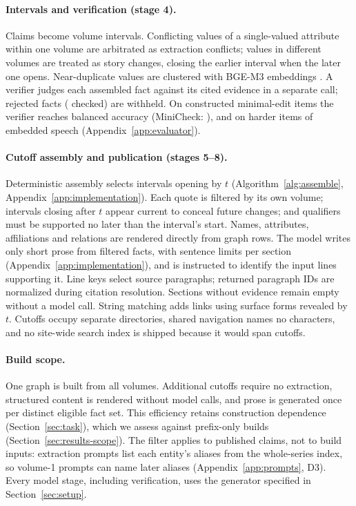 \paragraph{Intervals and verification (stage 4).}
Claims become volume intervals. Conflicting values of a single-valued attribute within one
volume are arbitrated as extraction conflicts; values in different volumes are treated as
story changes, closing the earlier interval when the later one opens. Near-duplicate values
are clustered with BGE-M3 embeddings \citep{chen2024m3}. A verifier judges each assembled
fact against its cited evidence in a separate call; rejected facts (
checked) are withheld.
On  constructed minimal-edit items the verifier reaches 
balanced accuracy (MiniCheck: ), and  on
 harder items of embedded speech (Appendix~\ref{app:evaluator}).

\paragraph{Cutoff assembly and publication (stages 5--8).}
Deterministic assembly selects intervals opening by $t$
(Algorithm~\ref{alg:assemble}, Appendix~\ref{app:implementation}). Each quote is filtered
by its own volume; intervals closing after $t$ appear current to conceal future changes;
and qualifiers must be supported no later than the interval's start. Names, attributes,
affiliations and relations are rendered directly from graph rows. The model writes only
short prose from filtered facts, with sentence limits per section
(Appendix~\ref{app:implementation}), and is instructed to identify the input lines supporting it.
Line keys select source paragraphs; returned paragraph IDs are normalized during citation
resolution. Sections without evidence remain empty without a model call.
String matching adds links using surface forms revealed by $t$. Cutoffs occupy separate
directories, shared navigation names no characters, and no site-wide search index is shipped
because it would span cutoffs.

\paragraph{Build scope.}
One graph is built from all volumes. Additional cutoffs require no extraction, structured
content is rendered without model calls, and prose is generated once per distinct eligible
fact set. This efficiency retains construction dependence (Section~\ref{sec:task}), which
we assess against prefix-only builds (Section~\ref{sec:results-scope}). The filter applies to
published claims, not to build inputs: extraction prompts list each entity's aliases from the
whole-series index, so volume-1 prompts can name later aliases (Appendix~\ref{app:prompts},
D3). Every model stage,
including verification, uses the generator specified in Section~\ref{sec:setup}.
